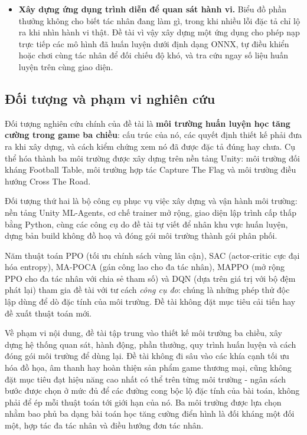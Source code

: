 \begin{itemize}
    \item \textbf{Xây dựng ứng dụng trình diễn để quan sát hành vi.} Biểu đồ phần thưởng
    không cho biết tác nhân đang làm gì, trong khi nhiều lỗi đặc tả chỉ lộ ra khi nhìn
    hành vi thật. Đề tài vì vậy xây dựng một ứng dụng cho phép nạp trực tiếp các mô hình
    đã huấn luyện dưới định dạng ONNX, tự điều khiển hoặc chơi cùng tác nhân để đối chiếu
    độ khó, và tra cứu ngay số liệu huấn luyện trên cùng giao diện.
\end{itemize}

\subsection{Đối tượng và phạm vi nghiên cứu}

\indent Đối tượng nghiên cứu chính của đề tài là \textbf{môi trường huấn luyện học tăng
cường trong game ba chiều}: cấu trúc của nó, các quyết định thiết kế phải đưa ra khi xây
dựng, và cách kiểm chứng xem nó đã được đặc tả đúng hay chưa. Cụ thể hóa thành ba môi
trường được xây dựng trên nền tảng Unity: môi trường đối kháng Football Table, môi
trường hợp tác Capture The Flag và môi trường điều hướng Cross The Road.

\indent Đối tượng thứ hai là bộ công cụ phục vụ việc xây dựng và vận hành môi trường:
nền tảng Unity ML-Agents, cơ chế trainer mở rộng, giao diện lập trình cấp thấp bằng
Python, cùng các công cụ do đề tài tự viết để nhân khu vực huấn luyện, dựng bản build
không đồ hoạ và đóng gói môi trường thành gói phân phối.

\indent Năm thuật toán PPO (tối ưu chính sách vùng lân cận), SAC (actor-critic cực đại
hóa entropy), MA-POCA (gán công lao cho đa tác nhân), MAPPO (mở rộng PPO cho đa tác nhân
với chia sẻ tham số) và DQN (dựa trên giá trị với bộ đệm phát lại) tham gia đề tài với
tư cách \textit{công cụ đo}: chúng là những phép thử độc lập dùng để dò đặc tính của môi
trường. Đề tài không đặt mục tiêu cải tiến hay đề xuất thuật toán mới.

\indent Về phạm vi nội dung, đề tài tập trung vào thiết kế môi trường ba chiều, xây
dựng hệ thống quan sát, hành động, phần thưởng, quy trình huấn luyện và cách đóng gói
môi trường để dùng lại. Đề tài không đi sâu vào các khía cạnh tối ưu hóa đồ họa, âm
thanh hay hoàn thiện sản phẩm game thương mại, cũng không đặt mục tiêu đạt hiệu năng
cao nhất có thể trên từng môi trường - ngân sách bước được chọn ở mức đủ để các đường
cong bộc lộ đặc tính của bài toán, không phải để ép mỗi thuật toán tới giới hạn của nó.
Ba môi trường được lựa chọn nhằm bao phủ ba dạng bài toán học tăng cường điển hình là
đối kháng một đối một, hợp tác đa tác nhân và điều hướng đơn tác nhân.

